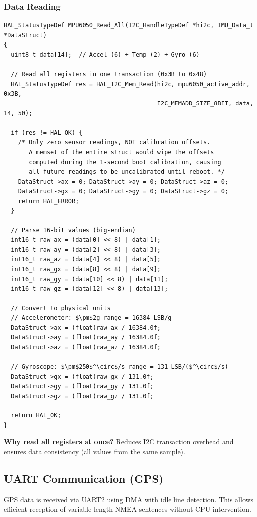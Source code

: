 \documentclass[11pt,a4paper]{article}
\begin{document}
\subsubsection{Data Reading}
\begin{lstlisting}[caption=MPU6050 Data Reading, label=lst:mpuread]
HAL_StatusTypeDef MPU6050_Read_All(I2C_HandleTypeDef *hi2c, IMU_Data_t *DataStruct)
{
  uint8_t data[14];  // Accel (6) + Temp (2) + Gyro (6)
  
  // Read all registers in one transaction (0x3B to 0x48)
  HAL_StatusTypeDef res = HAL_I2C_Mem_Read(hi2c, mpu6050_active_addr, 0x3B,
                                           I2C_MEMADD_SIZE_8BIT, data, 14, 50);
  
  if (res != HAL_OK) {
    /* Only zero sensor readings, NOT calibration offsets.
       A memset of the entire struct would wipe the offsets
       computed during the 1-second boot calibration, causing
       all future readings to be uncalibrated until reboot. */
    DataStruct->ax = 0; DataStruct->ay = 0; DataStruct->az = 0;
    DataStruct->gx = 0; DataStruct->gy = 0; DataStruct->gz = 0;
    return HAL_ERROR;
  }
  
  // Parse 16-bit values (big-endian)
  int16_t raw_ax = (data[0] << 8) | data[1];
  int16_t raw_ay = (data[2] << 8) | data[3];
  int16_t raw_az = (data[4] << 8) | data[5];
  int16_t raw_gx = (data[8] << 8) | data[9];
  int16_t raw_gy = (data[10] << 8) | data[11];
  int16_t raw_gz = (data[12] << 8) | data[13];
  
  // Convert to physical units
  // Accelerometer: $\pm$2g range = 16384 LSB/g
  DataStruct->ax = (float)raw_ax / 16384.0f;
  DataStruct->ay = (float)raw_ay / 16384.0f;
  DataStruct->az = (float)raw_az / 16384.0f;
  
  // Gyroscope: $\pm$250$^\circ$/s range = 131 LSB/($^\circ$/s)
  DataStruct->gx = (float)raw_gx / 131.0f;
  DataStruct->gy = (float)raw_gy / 131.0f;
  DataStruct->gz = (float)raw_gz / 131.0f;
  
  return HAL_OK;
}
\end{lstlisting}

\textbf{Why read all registers at once?} Reduces I2C transaction overhead and ensures data consistency (all values from the same sample).

\subsection{UART Communication (GPS)}
GPS data is received via UART2 using DMA with idle line detection. This allows efficient reception of variable-length NMEA sentences without CPU intervention.
\end{document}
